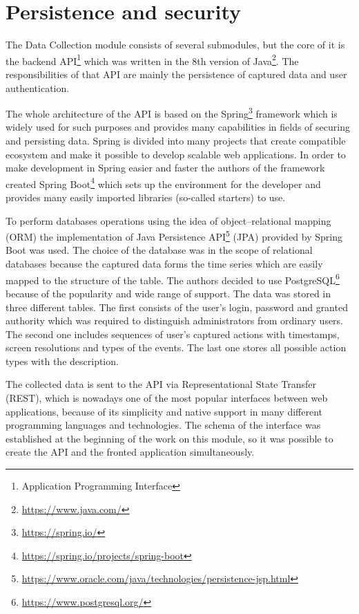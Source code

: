 \section{Persistence and security}\label{sec:persistence-and-security}
The Data Collection module consists of several submodules, but the core of it is the backend API\footnote{Application Programming Interface} which was written in the 8th version of Java\footnote{\url{https://www.java.com/}}.
The responsibilities of that API are mainly the persistence of captured data and user authentication.

The whole architecture of the API is based on the Spring\footnote{\url{https://spring.io/}} framework which is widely used for such purposes and provides many capabilities in fields of securing and persisting data.
Spring is divided into many projects that create compatible ecosystem and make it possible to develop scalable web applications.
In order to make development in Spring easier and faster the authors of the framework created Spring Boot\footnote{\url{https://spring.io/projects/spring-boot}} which sets up the environment for the developer and provides many easily imported libraries (so-called starters) to use.

To perform databases operations using the idea of object–relational mapping (ORM) the implementation of Java Persistence API\footnote{\url{https://www.oracle.com/java/technologies/persistence-jsp.html}} (JPA) provided by Spring Boot was used.
The choice of the database was in the scope of relational databases because the captured data forms the time series which are easily mapped to the structure of the table.
The authors decided to use PostgreSQL\footnote{\url{https://www.postgresql.org/}} because of the popularity and wide range of support.
The data was stored in three different tables.
The first consists of the user's login, password and granted authority which was required to distinguish administrators from ordinary users.
The second one includes sequences of user's captured actions with timestamps, screen resolutions and types of the events.
The last one stores all possible action types with the description.

The collected data is sent to the API via Representational State Transfer (REST), which is nowadays one of the most popular interfaces between web applications, because of its simplicity and native support in many different programming languages and technologies.
The schema of the interface was established at the beginning of the work on this module, so it was possible to create the API and the fronted application simultaneously.


